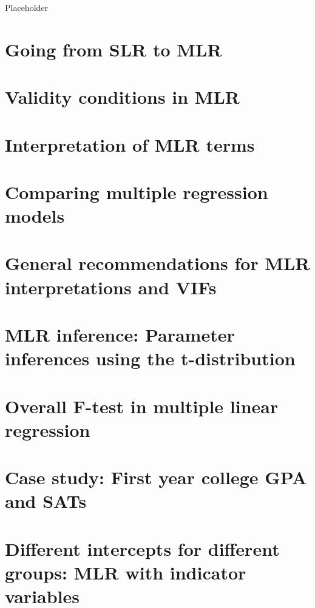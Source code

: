 \documentclass[]{book}
\begin{document}
Placeholder

\hypertarget{section8-1}{%
\section{Going from SLR to MLR}\label{section8-1}}

\hypertarget{section8-2}{%
\section{Validity conditions in MLR}\label{section8-2}}

\hypertarget{section8-3}{%
\section{Interpretation of MLR terms}\label{section8-3}}

\hypertarget{section8-4}{%
\section{Comparing multiple regression models}\label{section8-4}}

\hypertarget{section8-5}{%
\section{General recommendations for MLR interpretations and VIFs}\label{section8-5}}

\hypertarget{section8-6}{%
\section{MLR inference: Parameter inferences using the t-distribution}\label{section8-6}}

\hypertarget{section8-7}{%
\section{Overall F-test in multiple linear regression}\label{section8-7}}

\hypertarget{section8-8}{%
\section{Case study: First year college GPA and SATs}\label{section8-8}}

\hypertarget{section8-9}{%
\section{Different intercepts for different groups: MLR with indicator variables}\label{section8-9}}
\end{document}
